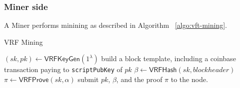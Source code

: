 
\subsubsection{Miner side}

A Miner performs minining as described in Algorithm ~\ref{algo:vft-mining}.

\begin{algorithm}[H]
\caption{VRF Mining}
\label{algo:vft-mining}
\SetAlgoLined
  $(sk, pk) \gets \mathsf{VRFKeyGen}(1^{\lambda})$\;
  build a block template, including a coinbase transaction paying to \texttt{scriptPubKey} of $pk$\;
  $\beta \gets \mathsf{VRFHash}(sk, blockheader)$\;
  $\pi \gets \mathsf{VRFProve}(sk, \alpha)$\;
  submit $pk$, $\beta$, and the proof $\pi$ to the node.
\end{algorithm}

